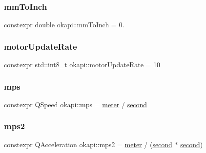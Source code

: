 \subsubsection{\texorpdfstring{mmToInch}{mmToInch}}
{\footnotesize\ttfamily constexpr double okapi\+::mm\+To\+Inch = 0.\hspace{0.3cm}{\ttfamily [static]}}

\mbox{\label{namespaceokapi_af6ac90c5f9ae02ffb17466bafcfbec4c}} 
\subsubsection{\texorpdfstring{motorUpdateRate}{motorUpdateRate}}
{\footnotesize\ttfamily constexpr std\+::int8\+\_\+t okapi\+::motor\+Update\+Rate = 10\hspace{0.3cm}{\ttfamily [static]}}

\mbox{\label{namespaceokapi_a133a7fbfd853bac09c6c9c2310ed8855}} 
\subsubsection{\texorpdfstring{mps}{mps}}
{\footnotesize\ttfamily constexpr Q\+Speed okapi\+::mps = \mbox{\hyperlink{namespaceokapi_a59563b3d4b18633f1c8d852e2932d1db}{meter}} / \mbox{\hyperlink{namespaceokapi_ae9ece1daf9cd9f6d3a597cc5c0dc7b40}{second}}}

\mbox{\label{namespaceokapi_a87ed91f18439f9e7e29392272f329f1c}} 
\subsubsection{\texorpdfstring{mps2}{mps2}}
{\footnotesize\ttfamily constexpr Q\+Acceleration okapi\+::mps2 = \mbox{\hyperlink{namespaceokapi_a59563b3d4b18633f1c8d852e2932d1db}{meter}} / (\mbox{\hyperlink{namespaceokapi_ae9ece1daf9cd9f6d3a597cc5c0dc7b40}{second}} $\ast$ \mbox{\hyperlink{namespaceokapi_ae9ece1daf9cd9f6d3a597cc5c0dc7b40}{second}})}

\mbox{\label{namespaceokapi_a66d91011ac90f25dc5e518f092cc5a74}} 
